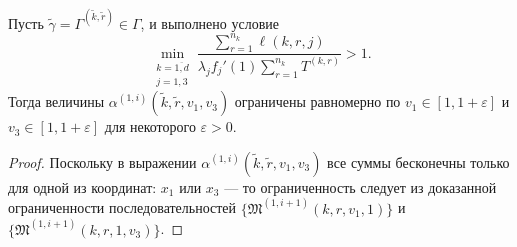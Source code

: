 \documentclass[a4paper,12pt,russian]{extarticle}
\begin{document}
\begin{lemma}
Пусть $\tilde{\gamma}=\Gamma^{(\tilde{k},\tilde{r})} \in \Gamma$, и выполнено условие
$$
\min_{\substack{k=\overline{1,d}\\ j=1,3}} { \frac{\sum_{r = 1}^{n_k} \ell(k,r,j) }{\lambda_j f_j'(1) \sum_{r=1}^{n_k} T^{(k,r)} }}>1.
$$
Тогда величины $ \alpha^{(1,i)}(\tilde{k},\tilde{r},v_1,v_3)$ ограничены равномерно по $v_1\in [1,1+\varepsilon]$ и $v_3\in [1,1+\varepsilon]$ для некоторого $\varepsilon > 0$.
\end{lemma}
\begin{proof}
Поскольку в выражении $\alpha^{(1,i)}(\tilde{k},\tilde{r},v_1,v_3)$ все суммы бесконечны только для одной из координат: $x_1$ или $x_3$ --- то ограниченность следует из доказанной ограниченности последовательностей $\{\mathfrak{M}^{(1,i+1)}(k,r,v_1,1)\}$ и $\{\mathfrak{M}^{(1,i+1)}(k,r,1,v_3)\}$.
\end{proof}
\end{document}
